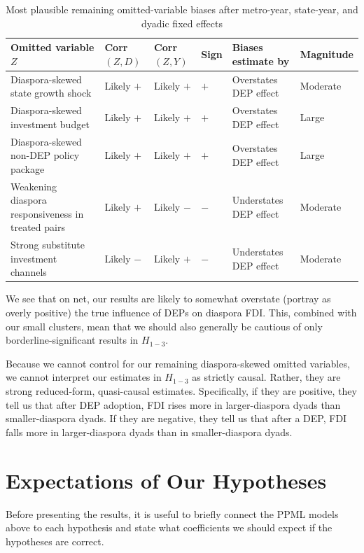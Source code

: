 \documentclass[doublespace,nopageskip]{UVAthesis}
\begin{document}
\begin{table}[htbp]
\centering
\caption{Most plausible remaining omitted-variable biases after metro-year, state-year, and dyadic fixed effects}
\label{tab:ovb_signing_fe}
\small
\begin{tabularx}{\textwidth}{@{}Y Z Z Z Y Y@{}}
\hline
Omitted variable $Z$ & Corr$(Z,D)$ & Corr$(Z,Y)$ & Sign & Biases estimate by & Magnitude \\
\hline
Diaspora-skewed state growth shock & Likely $+$ & Likely $+$ & $+$ & Overstates DEP effect & Moderate \\
Diaspora-skewed investment budget & Likely $+$ & Likely $+$ & $+$ & Overstates DEP effect & Large \\
Diaspora-skewed non-DEP policy package & Likely $+$ & Likely $+$ & $+$ & Overstates DEP effect & Large \\
Weakening diaspora responsiveness in treated pairs & Likely $+$ & Likely $-$ & $-$ & Understates DEP effect & Moderate \\
Strong substitute investment channels & Likely $-$ & Likely $+$ & $-$ & Understates DEP effect & Moderate \\
\hline
\end{tabularx}
\end{table}
We see that on net, our results are likely to somewhat overstate (portray as overly positive) the true influence of DEPs on diaspora FDI. This, combined with our small clusters, mean that we should also generally be cautious of only borderline-significant results in $H_{1-3}$. 

Because we cannot control for our remaining diaspora-skewed omitted variables, we cannot interpret our estimates in $H_{1-3}$ as strictly causal. Rather, they are strong reduced-form, quasi-causal estimates. Specifically, if they are positive, they tell us that after DEP adoption, FDI rises more in larger-diaspora dyads than smaller-diaspora dyads. If they are negative, they tell us that after a DEP, FDI falls more in larger-diaspora dyads than in smaller-diaspora dyads. 


\section{Expectations of Our Hypotheses} \label{ss:expectations}

Before presenting the results, it is useful to briefly connect the PPML models above to each hypothesis and state what coefficients we should expect if the hypotheses are correct.
\end{document}
